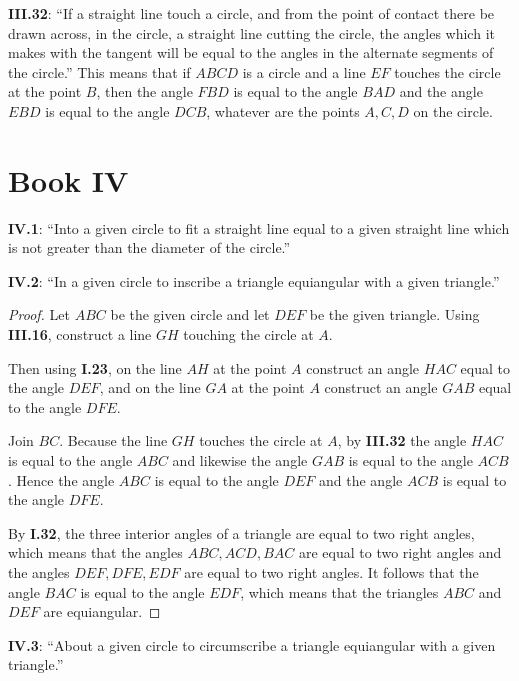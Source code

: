 \documentclass{article}
\begin{document}
\textbf{III.32}: ``If a straight line touch a circle, and from the point of
contact there be drawn across, in the circle, a straight line
cutting the circle, the angles which it makes with the tangent
will be equal to the angles in the alternate segments of the 
circle.'' This means that if $ABCD$ is a circle and a line $EF$ touches the circle at the point $B$,
then the angle $FBD$ is equal to the angle $BAD$ and the angle $EBD$ is equal to the angle $DCB$,
whatever are the points $A,C,D$ on the circle. 







\section{Book IV}
\textbf{IV.1}: ``Into a given circle to fit a straight line equal to a given
straight line which is not greater than the diameter of the 
circle.''

\textbf{IV.2}: ``In a given circle to inscribe a triangle equiangular with a given triangle.'' 

\begin{proof}
Let $ABC$ be the given circle and let $DEF$ be the given triangle. 
Using \textbf{III.16}, construct a line $GH$ touching the circle at $A$.

Then using \textbf{I.23}, 
on the line $AH$ at the point $A$ construct an angle $HAC$ equal to the angle $DEF$, and on the line
$GA$ at the point $A$ construct an angle $GAB$ equal to the angle $DFE$. 

Join $BC$. Because the line $GH$ touches the circle at $A$, by \textbf{III.32} the angle $HAC$ is equal to the angle $ABC$ and likewise
the angle $GAB$ is equal to the angle $ACB$. Hence the angle $ABC$ is equal to the angle $DEF$ and the angle
$ACB$ is equal to the angle $DFE$.

By \textbf{I.32}, the three interior angles of a triangle are equal to two right angles, which means
that the angles $ABC, ACD, BAC$ are equal to two right angles and the angles
$DEF,DFE,EDF$ are equal to two right angles. It follows that the angle $BAC$ is equal to the angle
$EDF$, which means that the triangles $ABC$ and $DEF$ are equiangular. 
\end{proof}

\textbf{IV.3}: ``About a given circle to circumscribe a triangle equiangular with a given triangle.''
\end{document}

